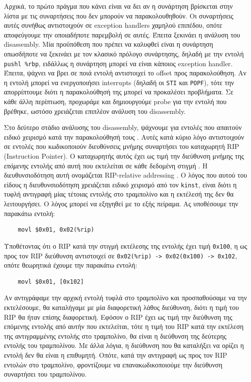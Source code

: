 \documentclass[12pt]{article}
\begin{document}
Αρχικά, το πρώτο πράγμα που κάνει είναι να δει αν η συνάρτηση βρίσκεται στην
λίστα με τις συναρτήσεις που δεν μπορούν να παρακολουθηθούν. Οι συναρτήσεις
αυτές συνήθως αντιστοιχούν σε exception handlers χαμηλού επιπέδου, οπότε
αποφεύγουμε την οποιαδήποτε παρεμβολή σε αυτές. Έπειτα ξεκινάει η ανάλυση του
disassembly. Μία προϋπόθεση που πρέπει να καλυφθεί είναι η συνάρτηση οπωσδήποτε
να ξεκινάει με τον κλασικό πρόλογο συνάρτησης, δηλαδή με την εντολή
\lstinline{pushl %rbp},
ειδάλλως η συνάρτηση μπορεί να είναι κάποιος exception handler. Έπειτα, ψάχνει
να βρει σε ποιά εντολή αντιστοιχεί το offset προς παρακολούθηση. Αν η εντολή
μπορεί να ενεργοποιήσει interrupts (δηλαδή οι \lstinline{STI} και
\lstinline{POPF}), τότε την απορρίπτουμε διότι η παρακολούθησή της μπορεί να
προκαλέσει προβλήματα. Σε κάθε άλλη περίπτωση, προχωράμε και δημιουργούμε probe
για την εντολή που βρέθηκε, ωστόσο χρειάζεται επιπλέον ανάλυση του disassembly.

Στο δεύτερο στάδιο ανάλυσης του disassembly, ψάχνουμε για εντολές που απαιτούν
ειδικό χειρισμό κατά την παρακολούθησή τους \cite{x86spec}. Αυτές κατά κύριο
λόγο αντιστοιχούν σε εντολές που κωδικοποιούν διευθύνσεις μνήμης συναρτήσει του
καταχωρητή RIP (Instruction Pointer). Ο καταχωρητής αυτός έχει ως τιμή την
διεύθυνση μνήμης της \textit{επόμενης} εντολής από αυτή που εκτελείται σε κάθε
δεδομένη στιγμή \cite{riprel}. Η διευθυνσιοδότηση αυτή ονομάζεται RIP-relative
addressing \cite{riprel}. Ο λόγος που αυτού του είδους η διευθυνσιοδότηση
χρειάζεται ειδικό χειρισμό από τον \lstinline{kinst}, είναι διότι η τυφλή
αντιγραφή μίας τέτοιας εντολής στο τραμπολίνο και η εκτέλεσή της δεν θα
λειτουργήσει. Ο λόγος μπορεί να εξηγηθεί με το εξής πείραμα. Ας υποθέσουμε την
παρακάτω εντολή:

\begin{Verbatim}
	movl $0x01, 0x02(%rip)
\end{Verbatim}

Υποθέτοντας ότι ο RIP κατά την στιγμή εκτέλεσης της εντολής έχει τιμή
\lstinline{0x100}, η ως προς τον RIP διεύθυνση αντιστοιχεί σε
\lstinline{0x02(%rip) -> 0x02(0x100) -> 0x102},
οπότε θεωρητικά έχουμε την παρακάτω εντολή:

\begin{Verbatim}
	movl $0x01, [0x102]
\end{Verbatim}

Αν αντιγράφαμε την αρχική εντολή τυφλά στο τραμπολίνο και προσπαθούσαμε να την
εκτελέσουμε, θα καταλήγαμε με μία διαφορετική λάθος διεύθυνση, διότι η τιμή του
RIP θα ήταν επίσης διαφορετική. Εφόσον ο RIP έχει ως τιμή την διεύθυνση της
επόμενης εντολής από αυτήν που εκτελείται, τότε η τιμή του RIP κατά την
εκτέλεση της αντιγραμμένης εντολής στο τραμπολίνο, θα είναι η διεύθυνση της
δεύτερης εντολής του τραμπολίνου. Με άλλα λόγια, η διεύθυνση που θα καταλήξει
να ορίζει η εντολή δεν θα είναι η επιθυμητή. Οπότε, κατά την αντιγραφή ως προς
τον RIP εντολών στο τραμπολίνο, φροντίζουμε να επανακωδικοποιούμε την διεύθυνση
συναρτήσει του τραμπολίνου.
\end{document}
